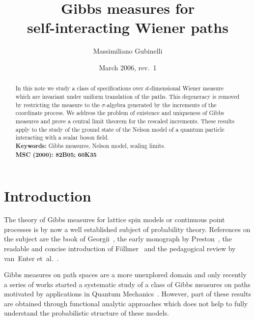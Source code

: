 \documentclass[a4paper,12pt,reqno]{amsart}
\begin{document}
\title[Gibbs measures on Wiener paths]
{Gibbs measures for \\self-interacting Wiener paths}
\author{Massimiliano Gubinelli} 
\address{Dip. di Matematical Applicata ``U.Dini'' -- Universit\`a di
Pisa\\ via Bonanno 25b\\
56125 Pisa - Italia.}
\date{March 2006, rev.~1}


\begin{abstract}
In this note we study a class of specifications over $d$-dimensional
Wiener measure which are invariant under uniform translation of
the paths. This degeneracy is removed by restricting the measure to the
$\sigma$-algebra generated by the increments of the coordinate process.
We address the problem of existence and uniqueness of Gibbs measures
 and prove a  central limit theorem for the rescaled increments. 
These results apply to the study of the ground state
 of the Nelson model of a quantum particle
interacting with a scalar boson field.\\[0.3cm]
\textbf{Keywords:} Gibbs measures, Nelson model, scaling limits.\\
\textbf{MSC (2000): 82B05; 60K35}
\end{abstract}

\maketitle
\section{Introduction}
The theory of Gibbs measures for lattice spin models or continuous
point processes is by now a well established subject of probability
theory. References on the subject are the book of Georgii~\cite{Georgii}, the early
monograph by Preston~\cite{Preston}, the readable and concise introduction of
F\"ollmer~\cite{Follmer} and the pedagogical review by van~Enter et~al.~\cite{jsp}. 

Gibbs measures on  path spaces
are a more unexplored domain and only recently a series of works
started a systematic study of a class of Gibbs measures on  paths 
motivated by applications in Quantum
Mechanics~\cite{BLS,BHLMS02,BetzLor03,Betz03}. However, part of these results
are obtained through functional analytic approaches which does not help
to fully understand the probabilistic structure of these models.
\end{document}
